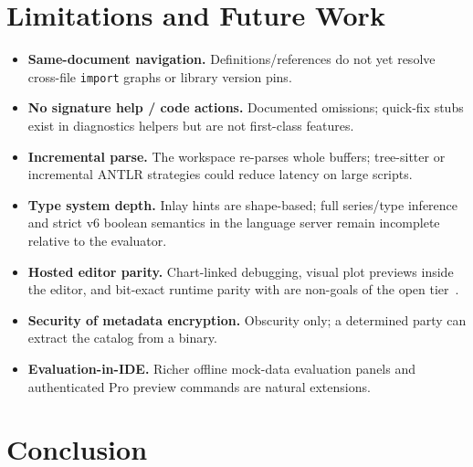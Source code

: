\documentclass[11pt,a4paper]{article}
\begin{document}
\section{Limitations and Future Work}
\label{sec:limits}

\begin{itemize}[leftmargin=*]
  \item \textbf{Same-document navigation.} Definitions/references do not yet resolve
        cross-file \texttt{import} graphs or library version pins.
  \item \textbf{No signature help / code actions.} Documented omissions; quick-fix
        stubs exist in diagnostics helpers but are not first-class features.
  \item \textbf{Incremental parse.} The workspace re-parses whole buffers; tree-sitter
        or incremental ANTLR strategies could reduce latency on large scripts.
  \item \textbf{Type system depth.} Inlay hints are shape-based; full series/type
        inference and strict v6 boolean semantics in the language server remain
        incomplete relative to the evaluator.
  \item \textbf{Hosted editor parity.} Chart-linked debugging, visual plot previews
        inside the editor, and bit-exact runtime parity with \tv{} are non-goals of
        the open \lsp{} tier~\citep{pynescript2026}.
  \item \textbf{Security of metadata encryption.} Obscurity only; a determined party
        can extract the catalog from a binary.
  \item \textbf{Evaluation-in-IDE.} Richer offline mock-data evaluation panels and
        authenticated Pro preview commands are natural extensions.
\end{itemize}

\section{Conclusion}
\label{sec:conclusion}
\end{document}
